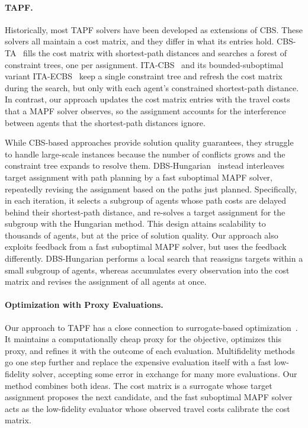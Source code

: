 \paragraph{TAPF.}
Historically, most TAPF solvers have been developed as extensions of CBS.
These solvers all maintain a cost matrix, and they differ in what its entries hold.
CBS-TA~\cite{honig2018ecbs-ta} fills the cost matrix with shortest-path distances and searches a forest of constraint trees, one per assignment.
ITA-CBS~\cite{tang2023ita-cbs} and its bounded-suboptimal variant ITA-ECBS~\cite{tang2024ita-ecbs} keep a single constraint tree and refresh the cost matrix during the search, but only with each agent's constrained shortest-path distance.
In contrast, our approach updates the cost matrix entries with the travel costs that a MAPF solver observes, so the assignment accounts for the interference between agents that the shortest-path distances ignore.

While CBS-based approaches provide solution quality guarantees, they struggle to handle large-scale instances because the number of conflicts grows and the constraint tree expands to resolve them. 
DBS-Hungarian~\cite{kumagai2026alternating} instead interleaves target assignment with path planning by a fast suboptimal MAPF solver, repeatedly revising the assignment based on the paths just planned.
Specifically, in each iteration, it selects a subgroup of agents whose path costs are delayed behind their shortest-path distance, and re-solves a target assignment for the subgroup with the Hungarian method.
This design attains scalability to thousands of agents, but at the price of solution quality.
Our approach also exploits feedback from a fast suboptimal MAPF solver, but uses the feedback differently.
DBS-Hungarian performs a local search that reassigns targets within a small subgroup of agents, whereas \planner accumulates every observation into the cost matrix and revises the assignment of all agents at once.  

\paragraph{Optimization with Proxy Evaluations.}
Our approach to TAPF has a close connection to surrogate-based optimization~\cite{forrester2009surrogate}.
It maintains a computationally cheap proxy for the objective, optimizes this proxy, and refines it with the outcome of each evaluation.
Multifidelity methods~\cite{peherstorfer2018survey} go one step further and replace the expensive evaluation itself with a fast low-fidelity solver, accepting some error in exchange for many more evaluations.
Our method combines both ideas.
The cost matrix is a surrogate whose target assignment proposes the next candidate, and the fast suboptimal MAPF solver acts as the low-fidelity evaluator whose observed travel costs calibrate the cost matrix.


